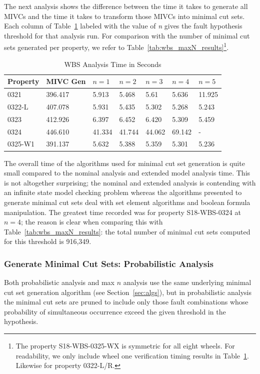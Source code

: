 The next analysis shows the difference between the time it takes to generate all MIVCs and the time it takes to transform those MIVCs into minimal cut sets. Each column of Table~\ref{tab:wbs_mincut} labeled with the value of \textit{n} gives the fault hypothesis threshold for that analysis run. For comparison with the number of minimal cut sets generated per property, we refer to Table~\ref{tab:wbs_maxN_results}\footnote{The property S18-WBS-0325-WX is symmetric for all eight wheels. For readability, we only include wheel one verification timing results in Table~\ref{tab:wbs_mincut}. Likewise for property 0322-L/R.}.
\begin{table}[htbp]
\begin{center}
    \begin{tabular}{ | l | l | l | l | l | l | l |}
    \hline
    \textbf{Property} &  MIVC Gen & $n=1$ & $n=2$ & $n=3$ & $n=4$ & $n=5$     \\ \hline \hline
    0321 & 396.417 & 5.913 & 5.468 & 5.61 & 5.636 & 11.925  \\ \hline
    0322-L  & 407.078 & 5.931 & 5.435 & 5.302 & 5.268 & 5.243 \\ \hline
    0323 & 412.926 & 6.397 & 6.452 & 6.420  & 5.309 & 5.459\\ \hline
    0324 & 446.610 & 41.334 & 41.744 & 44.062 & 69.142 & -\\ \hline
    0325-W1 & 391.137 & 5.632 & 5.388 &5.359 &5.301 & 5.236 \\ \hline
    \end{tabular}
    \caption{WBS Analysis Time in Seconds}
    \label{tab:wbs_mincut}
    \end{center}
\end{table}
The overall time of the algorithms used for minimal cut set generation is quite small compared to the nominal analysis and extended model analysis time. This is not altogether surprising; the nominal and extended analysis is contending with an infinite state model checking problem whereas the algorithms presented to generate minimal cut sets deal with set element algorithms and boolean formula manipulation. The greatest time recorded was for property S18-WBS-0324 at $n = 4$; the reason is clear when comparing this with Table~\ref{tab:wbs_maxN_results}: the total number of minimal cut sets computed for this threshold is 916,349.  

\subsubsection{Generate Minimal Cut Sets: Probabilistic Analysis}
\label{sec:prob_generate}
Both probabilistic analysis and max $n$ analysis use the same underlying minimal cut set generation algorithm (see Section~\ref{sec:algs}), but in probabilistic analysis the minimal cut sets are pruned to include only those fault combinations whose probability of simultaneous occurrence exceed the given threshold in the hypothesis. 


